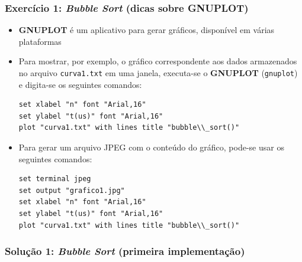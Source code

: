 \documentclass[aspectratio=169]{beamer}
\begin{document}
\begin{frame}[fragile]\frametitle{Exercício 1: \emph{Bubble Sort} (dicas sobre \textbf{GNUPLOT})}
\begin{itemize}
	\item \textbf{GNUPLOT} é um aplicativo para gerar gráficos, disponível em várias plataformas
	\item Para mostrar, por exemplo, o gráfico correspondente aos dados armazenados no arquivo \texttt{curva1.txt} em uma janela, executa-se o \textbf{GNUPLOT} (\texttt{gnuplot}) e digita-se os seguintes comandos:
{\scriptsize
\begin{verbatim}
set xlabel "n" font "Arial,16"
set ylabel "t(us)" font "Arial,16"
plot "curva1.txt" with lines title "bubble\\_sort()"
\end{verbatim}
}
	\item Para gerar um arquivo JPEG com o conteúdo do gráfico, pode-se usar os seguintes comandos:
{\scriptsize
\begin{verbatim}
set terminal jpeg
set output "grafico1.jpg"
set xlabel "n" font "Arial,16"
set ylabel "t(us)" font "Arial,16"
plot "curva1.txt" with lines title "bubble\\_sort()"
\end{verbatim}
}
\end{itemize}
\end{frame}

\begin{frame}[fragile]\frametitle{Solução 1: \emph{Bubble Sort} (primeira implementação)}
{\scriptsize}
\end{frame}
\end{document}
